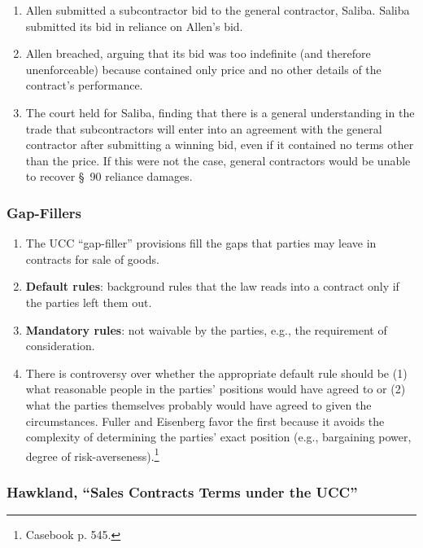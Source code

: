 \begin{enumerate}
    \item Allen submitted a subcontractor bid to the general contractor, 
    Saliba. Saliba submitted its bid in reliance on Allen's bid.
    \item Allen breached, arguing that its bid was too indefinite (and 
    therefore unenforceable) because contained only price and no other details 
    of the contract's performance.
    \item The court held for Saliba, finding that there is a general 
    understanding in the trade that subcontractors will enter into an 
    agreement with the general contractor after submitting a winning bid, even 
    if it contained no terms other than the price. If this were not the case, 
    general contractors would be unable to recover \S\ 90 reliance damages.
\end{enumerate}

\subsubsection{Gap-Fillers}

\begin{enumerate}
    \item The UCC ``gap-filler'' provisions fill the gaps that parties may 
    leave in contracts for sale of goods.
    \item \textbf{Default rules}: background rules that the law reads into a 
    contract only if the parties left them out.
    \item \textbf{Mandatory rules}: not waivable by the parties, e.g., the 
    requirement of consideration.
    \item There is controversy over whether the appropriate default rule 
    should be (1) what reasonable people in the parties' positions would have 
    agreed to or (2) what the parties themselves probably would have agreed to 
    given the circumstances. Fuller and Eisenberg favor the first because it 
    avoids the complexity of determining the parties' exact position (e.g., 
    bargaining power, degree of risk-averseness).\footnote{Casebook p. 545.}
\end{enumerate}

\subsubsection{Hawkland, ``Sales Contracts Terms under the UCC''}

